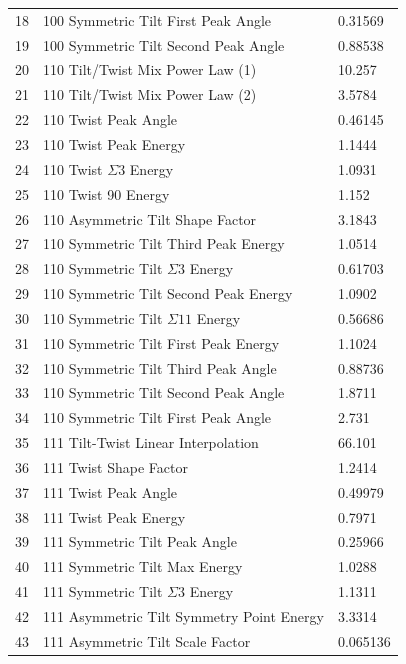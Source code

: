 \documentclass[twoside,senior]{BYUPhys}
\begin{document}
\begin{longtable}{r l l}
18 & \textlangle{}100\textrangle{} Symmetric Tilt First Peak Angle & 0.31569 \\
19 & \textlangle{}100\textrangle{} Symmetric Tilt Second Peak Angle & 0.88538 \\
20 & \textlangle{}110\textrangle{} Tilt/Twist Mix Power Law (1) & 10.257 \\
21 & \textlangle{}110\textrangle{} Tilt/Twist Mix Power Law (2) & 3.5784 \\
22 & \textlangle{}110\textrangle{} Twist Peak Angle & 0.46145 \\
23 & \textlangle{}110\textrangle{} Twist Peak Energy & 1.1444 \\
24 & \textlangle{}110\textrangle{} Twist $\Sigma3$ Energy & 1.0931 \\
25 & \textlangle{}110\textrangle{} Twist 90\textdegree{} Energy & 1.152 \\
26 & \textlangle{}110\textrangle{} Asymmetric Tilt Shape Factor & 3.1843 \\
27 & \textlangle{}110\textrangle{} Symmetric Tilt Third Peak Energy & 1.0514 \\
28 & \textlangle{}110\textrangle{} Symmetric Tilt $\Sigma3$ Energy & 0.61703 \\
29 & \textlangle{}110\textrangle{} Symmetric Tilt Second Peak Energy & 1.0902 \\
30 & \textlangle{}110\textrangle{} Symmetric Tilt $\Sigma11$ Energy & 0.56686 \\
31 & \textlangle{}110\textrangle{} Symmetric Tilt First Peak Energy & 1.1024 \\
32 & \textlangle{}110\textrangle{} Symmetric Tilt Third Peak Angle & 0.88736 \\
33 & \textlangle{}110\textrangle{} Symmetric Tilt Second Peak Angle & 1.8711 \\
34 & \textlangle{}110\textrangle{} Symmetric Tilt First Peak Angle & 2.731 \\
35 & \textlangle{}111\textrangle{} Tilt-Twist Linear Interpolation & 66.101 \\
36 & \textlangle{}111\textrangle{} Twist Shape Factor & 1.2414 \\
37 & \textlangle{}111\textrangle{} Twist Peak Angle & 0.49979 \\
38 & \textlangle{}111\textrangle{} Twist Peak Energy & 0.7971 \\
39 & \textlangle{}111\textrangle{} Symmetric Tilt Peak Angle & 0.25966 \\
40 & \textlangle{}111\textrangle{} Symmetric Tilt Max Energy & 1.0288 \\
41 & \textlangle{}111\textrangle{} Symmetric Tilt $\Sigma3$ Energy & 1.1311 \\
42 & \textlangle{}111\textrangle{} Asymmetric Tilt Symmetry Point Energy & 3.3314 \\
43 & \textlangle{}111\textrangle{} Asymmetric Tilt Scale Factor & 0.065136 \\
\end{longtable}
\end{document}
